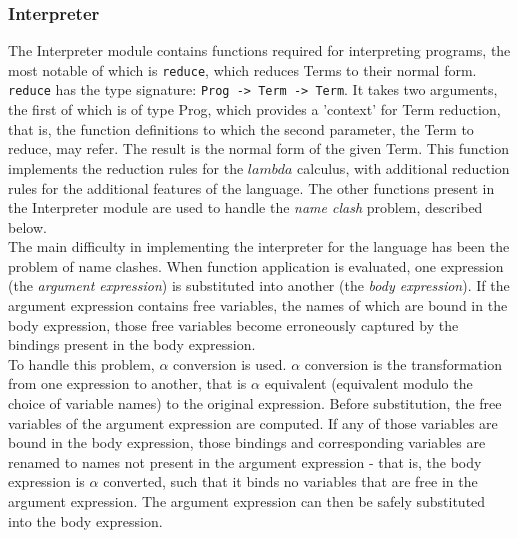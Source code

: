 \documentclass{article}
\begin{document}
\subsubsection{Interpreter}
The Interpreter module contains functions required for interpreting programs, the most notable of which is \texttt{reduce}, which reduces Terms to their normal form. \texttt{reduce} has the type signature: \texttt{Prog -> Term -> Term}. It takes two arguments, the first of which is of type Prog, which provides a 'context' for Term reduction, that is, the function definitions to which the second parameter, the Term to reduce, may refer. The result is the normal form of the given Term. This function implements the reduction rules for the $lambda$ calculus, with additional reduction rules for the additional features of the language. The other functions present in the Interpreter module are used to handle the \emph{name clash} problem, described below.
\\\indent The main difficulty in implementing the interpreter for the language has been the problem of name clashes. When function application is evaluated, one expression (the \emph{argument expression}) is substituted into another (the \emph{body expression}). If the argument expression contains free variables, the names of which are bound in the body expression, those free variables become erroneously captured by the bindings present in the body expression.
\\\indent To handle this problem, $\alpha$ conversion is used. $\alpha$ conversion is the transformation from one expression to another, that is $\alpha$ equivalent (equivalent modulo the choice of variable names) to the original expression. Before substitution, the free variables of the argument expression are computed. If any of those variables are bound in the body expression, those bindings and corresponding variables are renamed to names not present in the argument expression - that is, the body expression is $\alpha$ converted, such that it binds no variables that are free in the argument expression. The argument expression can then be safely substituted into the body expression.
\end{document}
